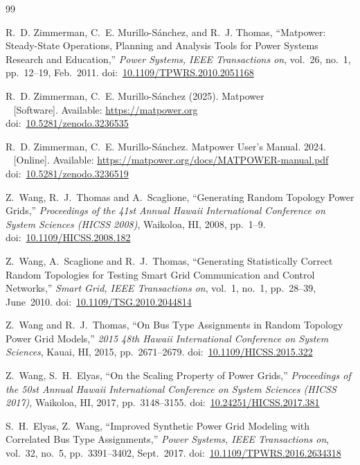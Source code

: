 \documentclass[12pt]{article}
\newcommand{\matpower}[0]{{\sc Matpower}}
\newcommand{\doi}[1]{doi:~\href{https://doi.org/#1}{#1}}
\numberwithin{equation}{section}
\numberwithin{table}{section}
\numberwithin{figure}{section}
\begin{document}
\clearpage
\begin{thebibliography}{99}

R.~D. Zimmerman, C.~E. Murillo-S{\'a}nchez, and R.~J. Thomas, ``\matpower{}: Steady-State Operations, Planning and Analysis Tools for Power Systems Research and Education,'' \emph{Power Systems, IEEE Transactions on}, vol.~26, no.~1, pp.~12--19, Feb.~2011. \doi{10.1109/TPWRS.2010.2051168}

R.~D. Zimmerman, C.~E. Murillo-S{\'a}nchez (2025). \matpower{}\\~
[Software]. Available: \url{https://matpower.org}\\
\doi{10.5281/zenodo.3236535}

R.~D. Zimmerman, C.~E. Murillo-S{\'a}nchez. \matpower{} User's Manual. 2024.\\~
[Online]. Available: \url{https://matpower.org/docs/MATPOWER-manual.pdf}\\
\doi{10.5281/zenodo.3236519}

Z.~Wang, R.~J.~Thomas and A.~Scaglione, ``Generating Random Topology Power Grids,'' \emph{Proceedings of the 41st Annual Hawaii International Conference on System Sciences (HICSS 2008)}, Waikoloa, HI, 2008, pp.~1--9.
\doi{10.1109/HICSS.2008.182}

Z.~Wang, A.~Scaglione and R.~J.~Thomas, ``Generating Statistically Correct Random Topologies for Testing Smart Grid Communication and Control Networks,'' \emph{Smart Grid, IEEE Transactions on}, vol.~1, no.~1, pp.~28--39, June~2010.
\doi{10.1109/TSG.2010.2044814}

Z.~Wang and R.~J.~Thomas, ``On Bus Type Assignments in Random Topology Power Grid Models,'' \emph{2015 48th Hawaii International Conference on System Sciences}, Kauai, HI, 2015, pp.~2671--2679.
\doi{10.1109/HICSS.2015.322}

Z.~Wang, S.~H.~Elyas, ``On the Scaling Property of Power Grids,'' \emph{Proceedings of the 50st Annual Hawaii International Conference on System Sciences (HICSS 2017)}, Waikoloa, HI, 2017, pp.~3148--3155.
\doi{10.24251/HICSS.2017.381}

S.~H.~Elyas, Z.~Wang, ``Improved Synthetic Power Grid Modeling with Correlated Bus Type Assignments,'' \emph{Power Systems, IEEE Transactions on}, vol.~32, no.~5, pp.~3391--3402, Sept.~2017.
\doi{10.1109/TPWRS.2016.2634318}


\end{thebibliography}
\end{document}
